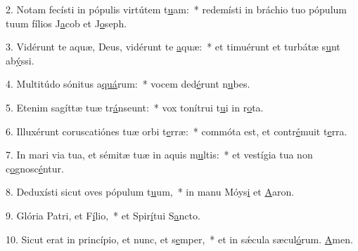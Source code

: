 2. Notam fecísti in pópulis virtútem t\uline{u}am:~* redemísti in bráchio tuo pópulum tuum fílios J\uline{a}cob et J\uline{o}seph.\par 
3. Vidérunt te aquæ, Deus, vidérunt te \uline{a}quæ:~* et timuérunt et turbátæ s\uline{u}nt ab\uline{ý}ssi.\par 
4. Multitúdo sónitus a\uline{quá}rum:~* vocem ded\uline{é}runt n\uline{u}bes.\par 
5. Etenim sagíttæ tuæ tr\uline{á}nseunt:~* vox tonítrui t\uline{u}i in r\uline{o}ta.\par 
6. Illuxérunt coruscatiónes tuæ orbi t\uline{e}rræ:~* commóta est, et contr\uline{é}muit t\uline{e}rra.\par 
7. In mari via tua, et sémitæ tuæ in aquis m\uline{u}ltis:~* et vestígia tua non c\uline{o}gnosc\uline{é}ntur.\par 
8. Deduxísti sicut oves pópulum t\uline{u}um,~* in manu Móys\uline{i} et \uline{A}aron.\par 
9. Glória Patri, et F\uline{í}lio,~* et Spir\uline{í}tui S\uline{a}ncto.\par 
10. Sicut erat in princípio, et nunc, et s\uline{e}mper,~* et in sǽcula sæcul\uline{ó}rum. \uline{A}men.\par 
